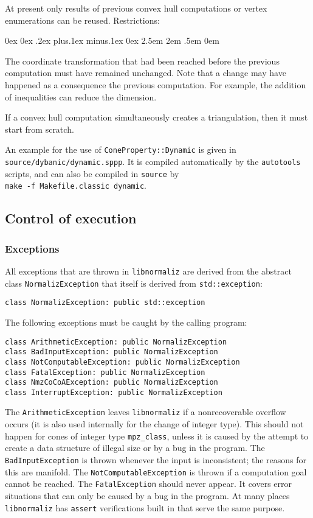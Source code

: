 \documentclass[12pt,a4paper]{scrartcl}
\newcounter{listi}
\newcommand{\stdli}{ \topsep0ex \partopsep0ex %
\parsep.2ex plus.1ex minus.1ex \itemsep0ex%
\leftmargin2.5em \labelwidth2em \labelsep.5em \rightmargin0em}%
\newenvironment{arab}{\begin{list}{\textup{(\arabic{listi})}}%
	{\usecounter{listi}\stdli}}{\end{list}}
\theoremstyle{definition}
\begin{document}
\begin{small}
At present only results of previous convex hull computations or vertex enumerations can be reused. Restrictions:
\begin{arab}
	\item The coordinate transformation that had been reached before the previous computation must have remained unchanged. Note that a change may have happened as a consequence the previous computation. For example, the addition of inequalities can reduce the dimension.
	\item If a convex hull computation simultaneously creates a triangulation, then it must start from scratch. 
\end{arab}

An example for the use of \verb|ConeProperty::Dynamic| is given in \verb|source/dybanic/dynamic.sppp|. It is compiled automatically by the \verb|autotools| scripts, and can also be compiled in \verb|source| by\\ \verb|make -f Makefile.classic dynamic|.

\subsection{Control of execution}

\subsubsection{Exceptions}

All exceptions that are thrown in \verb|libnormaliz| are derived from the abstract class \verb|NormalizException| that itself is derived from \verb|std::exception|:
\begin{Verbatim}
class NormalizException: public std::exception
\end{Verbatim}

The following exceptions must be caught by the calling program:
\begin{Verbatim}
class ArithmeticException: public NormalizException
class BadInputException: public NormalizException
class NotComputableException: public NormalizException
class FatalException: public NormalizException
class NmzCoCoAException: public NormalizException
class InterruptException: public NormalizException
\end{Verbatim}

The \verb|ArithmeticException| leaves \verb|libnormaliz| if a nonrecoverable overflow occurs (it is also used internally for the change of integer type). This should not happen for cones of integer type \verb|mpz_class|, unless it is caused by the attempt to create a data structure of illegal size or by a bug in the program. The \verb|BadInputException| is thrown whenever the input is inconsistent; the reasons for this are manifold. The \verb|NotComputableException| is thrown if a computation goal cannot be reached. The \verb|FatalException| should never appear. It covers error situations that can only be caused by a bug in the program. At many places \verb|libnormaliz| has \verb|assert| verifications built in that serve the same purpose. 


\end{small}
\end{document}
